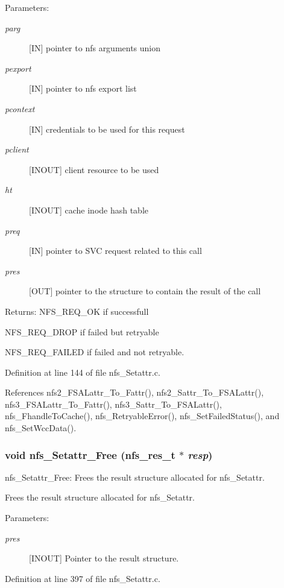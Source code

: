 \begin{Desc}
\item[Parameters:]
\begin{description}
\item[{\em parg}][IN] pointer to nfs arguments union \item[{\em pexport}][IN] pointer to nfs export list \item[{\em pcontext}][IN] credentials to be used for this request \item[{\em pclient}][INOUT] client resource to be used \item[{\em ht}][INOUT] cache inode hash table \item[{\em preq}][IN] pointer to SVC request related to this call \item[{\em pres}][OUT] pointer to the structure to contain the result of the call\end{description}
\end{Desc}
\begin{Desc}
\item[Returns:]NFS\_\-REQ\_\-OK if successfull \par
 NFS\_\-REQ\_\-DROP if failed but retryable \par
 NFS\_\-REQ\_\-FAILED if failed and not retryable. \end{Desc}


Definition at line 144 of file nfs\_\-Setattr.c.

References nfs2\_\-FSALattr\_\-To\_\-Fattr(), nfs2\_\-Sattr\_\-To\_\-FSALattr(), nfs3\_\-FSALattr\_\-To\_\-Fattr(), nfs3\_\-Sattr\_\-To\_\-FSALattr(), nfs\_\-Fhandle\-To\-Cache(), nfs\_\-Retryable\-Error(), nfs\_\-Set\-Failed\-Status(), and nfs\_\-Set\-Wcc\-Data().
\subsubsection{\setlength{\rightskip}{0pt plus 5cm}void nfs\_\-Setattr\_\-Free (nfs\_\-res\_\-t $\ast$ {\em resp})}\label{nfs__Setattr_8c_a1}


nfs\_\-Setattr\_\-Free: Frees the result structure allocated for nfs\_\-Setattr.

Frees the result structure allocated for nfs\_\-Setattr.

\begin{Desc}
\item[Parameters:]
\begin{description}
\item[{\em pres}][INOUT] Pointer to the result structure. \end{description}
\end{Desc}


Definition at line 397 of file nfs\_\-Setattr.c.